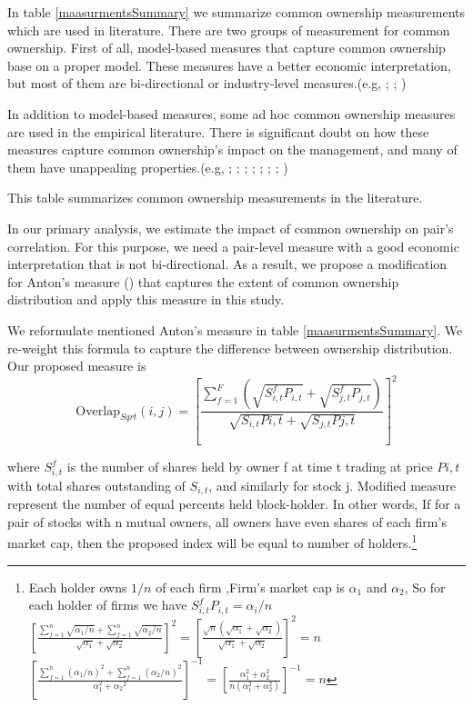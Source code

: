 In table \ref{maasurmentsSummary} we summarize common ownership measurements which are used in literature. There are two groups of measurement for common ownership.
First of all, model-based measures that capture common ownership base on a proper  model. These measures have a better economic interpretation, but most of them are bi-directional or industry-level measures.(e.g, \cite{harford2011institutional}; \cite{azar2018anticompetitive}; \cite{gilje2020s})

In addition to model-based measures, some ad hoc common ownership measures are used in the empirical literature. There is significant doubt on how these measures capture common ownership's impact on the management, and many of them have unappealing properties.(e.g, \cite{AntonPolk}; \cite{azar2011new}; \cite{freeman2019effects}; \cite{hansen1996externalities};  \cite{he2017product}; \cite{he2019internalizing}; \cite{lewellen2021does}; \cite{newham2018common})
	{\begin{table}[htbp]
			\centering
			\scriptsize
			\caption{ This table summarizes common ownership measurements in the literature.}
			\label{maasurmentsSummary}
			\resizebox{\textwidth}{!}{
				
			}
		\end{table}
	}
	
In our primary analysis, we estimate the impact of common ownership on pair's correlation. For this purpose, we need a pair-level measure with a good economic interpretation that is not bi-directional. As a result, we propose a modification for Anton's measure (\cite{AntonPolk}) that captures the extent of common ownership distribution and apply this measure in this study.

We reformulate mentioned Anton's measure in table \ref{maasurmentsSummary}.
We re-weight this formula to capture the difference between ownership distribution. Our proposed measure is
\begin{equation}
	\text{Overlap}_{Sqrt}(i, j) =  [\frac{\sum_{f =1}^{F}(\sqrt{S^f_{i,t}P_{i,t}}+\sqrt{S^f_{j,t}P_{j,t}})}{\sqrt{S_{i,t}P{i,t}} + \sqrt{S_{j,t}P{j,t}}}]^2 
	\label{sqrt}
\end{equation}

where $ S^f_{i,t}$ is the number of shares held by owner f
at time t trading at price $ P{i,t} $ with total shares outstanding of $ S_{i,t} $, and similarly for stock j. Modified measure represent the number of equal percents held block-holder. In other words, If for a pair of stocks with n mutual owners, all owners have even shares of each firm's market cap, then the proposed index will be equal to number of holders.\footnote{ \tiny
	Each holder owns $ 1/n $ of each firm ,Firm's market cap is $ \alpha_1 $ and $ \alpha_2 $, So for each holder of firms we have $ S^f_{i,t}P_{i,t} = \alpha_i/n $\\
	$
	[  \frac{\sum_{f=1}^{n} \sqrt{\alpha_1/n}+\sum_{f=1}^{n} \sqrt{\alpha_2/n}}{\sqrt{\alpha_1} + \sqrt{\alpha_2}}]^2 
	= [\frac{\sqrt{n}(\sqrt{\alpha_1} +\sqrt{\alpha_2 })}{\sqrt{\alpha_1} + \sqrt{\alpha_2}}]^2 = n $
	\\
	$
	[\frac{\sum_{f=1}^{n} {(\alpha_1/n)^2}+\sum_{f=1}^{n} {(\alpha_2/n)^2}}{\alpha_1^2 +{\alpha_2}^2}]^{-1} = [\frac{{\alpha_1^2 + \alpha_2^2 }}{n(\alpha_1^2 + \alpha_2^2)}]^{-1} = n
	$
}

